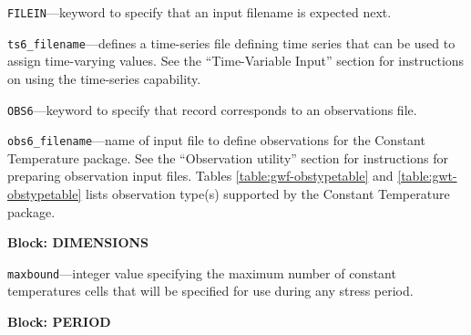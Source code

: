 \begin{description}
\item \texttt{FILEIN}---keyword to specify that an input filename is expected next.

\item \texttt{ts6\_filename}---defines a time-series file defining time series that can be used to assign time-varying values. See the ``Time-Variable Input'' section for instructions on using the time-series capability.

\item \texttt{OBS6}---keyword to specify that record corresponds to an observations file.

\item \texttt{obs6\_filename}---name of input file to define observations for the Constant Temperature package. See the ``Observation utility'' section for instructions for preparing observation input files. Tables \ref{table:gwf-obstypetable} and \ref{table:gwt-obstypetable} lists observation type(s) supported by the Constant Temperature package.

\end{description}
\item \textbf{Block: DIMENSIONS}

\begin{description}
\item \texttt{maxbound}---integer value specifying the maximum number of constant temperatures cells that will be specified for use during any stress period.

\end{description}
\item \textbf{Block: PERIOD}

